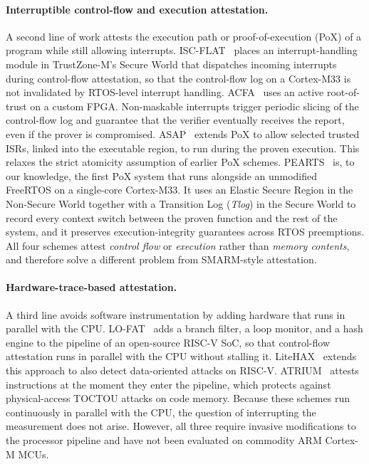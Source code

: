 \documentclass[journal]{IEEEtran}
\begin{document}
{\paragraph{Interruptible control-flow and execution
attestation.}
A second line of work attests the execution path or
proof-of-execution (PoX) of a program while still allowing
interrupts.
ISC-FLAT~\cite{iscflat} places an interrupt-handling
module in TrustZone-M's Secure World that dispatches
incoming interrupts during control-flow attestation, so
that the control-flow log on a Cortex-M33 is not
invalidated by RTOS-level interrupt handling.
ACFA~\cite{acfa} uses an active root-of-trust on a custom
FPGA. Non-maskable interrupts trigger periodic slicing of
the control-flow log and guarantee that the verifier
eventually receives the report, even if the prover is
compromised.
ASAP~\cite{asap} extends PoX to allow selected trusted
ISRs, linked into the executable region, to run during the
proven execution. This relaxes the strict atomicity
assumption of earlier PoX schemes.
PEARTS~\cite{pearts} is, to our knowledge, the first PoX
system that runs alongside an unmodified FreeRTOS on a
single-core Cortex-M33. It uses an Elastic Secure Region
in the Non-Secure World together with a Transition Log
(\textit{Tlog}) in the Secure World to record every
context switch between the proven function and the rest
of the system, and it preserves execution-integrity
guarantees across RTOS preemptions.
All four schemes attest \emph{control flow} or
\emph{execution} rather than \emph{memory contents}, and
therefore solve a different problem from SMARM-style
attestation.

\paragraph{Hardware-trace-based attestation.}
A third line avoids software instrumentation by adding
hardware that runs in parallel with the CPU.
LO-FAT~\cite{lofat} adds a branch filter, a loop monitor,
and a hash engine to the pipeline of an open-source
RISC-V SoC, so that control-flow attestation runs in
parallel with the CPU without stalling it.
LiteHAX~\cite{litehax} extends this approach to also
detect data-oriented attacks on RISC-V.
ATRIUM~\cite{atrium} attests instructions at the moment
they enter the pipeline, which protects against
physical-access TOCTOU attacks on code memory.
Because these schemes run continuously in parallel with
the CPU, the question of interrupting the measurement does
not arise. However, all three require invasive
modifications to the processor pipeline and have not been
evaluated on commodity ARM Cortex-M MCUs.

}
\end{document}

